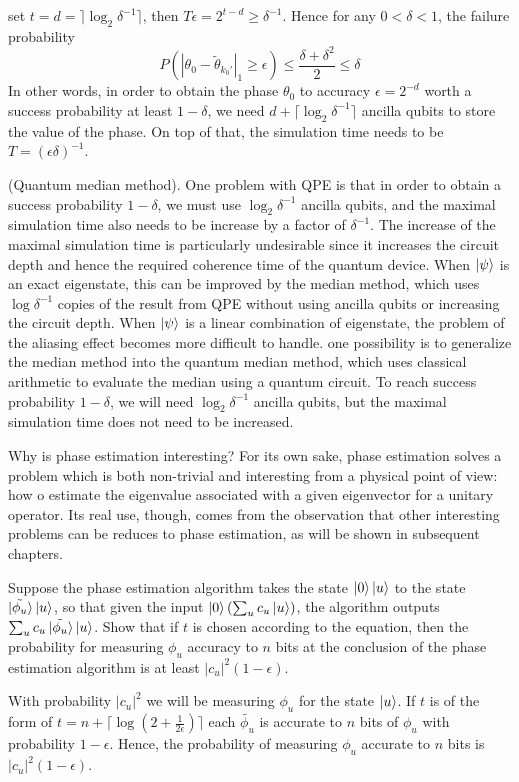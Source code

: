 set $t=d=\rceil \log_2\delta^{-1}\rceil$, then $T\epsilon =2^{t-d}\geq \delta^{-1}$. Hence for any $0<\delta <1$, the failure probability
\[
P(|\theta_0-\tilde{\theta}_{k_0'}|_1\geq \epsilon)\leq \frac{\delta +\delta^2}{2}\leq \delta
\]
In other words, in order to obtain the phase $\theta_0$ to accuracy $\epsilon=2^{-d}$ worth a success probability at least $1-\delta$, we need $d+\lceil \log_2 \delta^{-1}\rceil$ ancilla qubits to store the value of the phase. On top of that, the simulation time needs to be $T=(\epsilon\delta)^{-1}$.

\begin{remark}
    (Quantum median method). One problem with QPE is that in order to obtain a success probability $1-\delta$, we must use $\log_2\delta^{-1}$ ancilla qubits, and the maximal simulation time also needs to be increase by a factor of $\delta^{-1}$. The increase of the maximal simulation time is particularly undesirable since it increases the circuit depth and hence the required coherence time of the quantum device. When $\ket{\psi}$ is an exact eigenstate, this can be improved by the median method, which uses $\log \delta^{-1}$ copies of the result from QPE without using ancilla qubits or increasing the circuit depth. When $\ket{\psi}$ is a linear combination of eigenstate, the problem of the aliasing effect becomes more difficult to handle. one possibility is to generalize the median method into the quantum median method, which uses classical arithmetic to evaluate the median using a quantum circuit. To reach success probability $1-\delta$, we will need $\log_2\delta^{-1}$ ancilla qubits, but the maximal simulation time does not need to be increased.
\end{remark}

Why is phase estimation interesting? For its own sake, phase estimation solves a problem which is both non-trivial and interesting from a physical point of view: how o estimate the eigenvalue associated with a given eigenvector for a unitary operator. Its real use, though, comes from the observation that other interesting problems can be reduces to phase estimation, as will be shown in subsequent chapters.

\begin{example}
    Suppose the phase estimation algorithm takes the state $\ket{0}\ket{u}$ to the state $\ket{\tilde{\phi_u}}\ket{u}$, so that given the input $\ket{0} (\sum_u c_u\ket{u})$, the algorithm outputs $\sum_u c_u \ket{\tilde{\phi_u}}\ket{u}$. Show that if $t$ is chosen according to the equation, then the probability for measuring $\phi_u$ accuracy to $n$ bits at the conclusion of the phase estimation algorithm is at least $|c_u|^2(1-\epsilon)$.

    With probability $|c_u|^2$ we will be measuring $\phi_u$ for the state $\ket{u}$. If $t$ is of the form of $t=n+\lceil \log\left(2+\frac{1}{2\epsilon}\right)\rceil$ each $\tilde{\phi_u}$ is accurate to $n$ bits of $\phi_u$ with probability $1-\epsilon$. Hence, the probability of measuring $\phi_u$ accurate to $n$ bits is $|c_u|^2(1-\epsilon)$.
\end{example}

